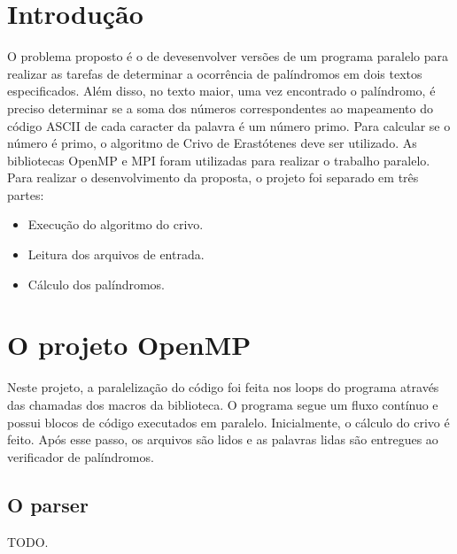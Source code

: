 \documentclass[a4paper]{article}
\begin{document}
\section{Introdução}
\indent \indent O problema proposto é o de devesenvolver versões de um programa paralelo para realizar as tarefas de determinar a ocorrência de palíndromos em dois textos especificados. Além disso, no texto maior, uma vez encontrado o palíndromo, é preciso determinar se a soma dos números correspondentes ao mapeamento do código ASCII de cada caracter da palavra é um número primo. Para calcular se o número é primo, o algoritmo de Crivo de Erastótenes deve ser utilizado. As bibliotecas OpenMP e MPI foram utilizadas para realizar o trabalho paralelo.\\
Para realizar o desenvolvimento da proposta, o projeto foi separado em três partes:
\begin{itemize}
	\item Execução do algoritmo do crivo.
	\item Leitura dos arquivos de entrada.
	\item Cálculo dos palíndromos.
\end{itemize}

\section{O projeto OpenMP}
\indent \indent Neste projeto, a paralelização do código foi feita nos loops do programa através das chamadas dos macros da biblioteca. O programa segue um fluxo contínuo e possui blocos de código executados em paralelo. Inicialmente, o cálculo do crivo é feito. Após esse passo, os arquivos são lidos e as palavras lidas são entregues ao verificador de palíndromos.

\subsection{O parser}

\indent \indent TODO.
\end{document}
